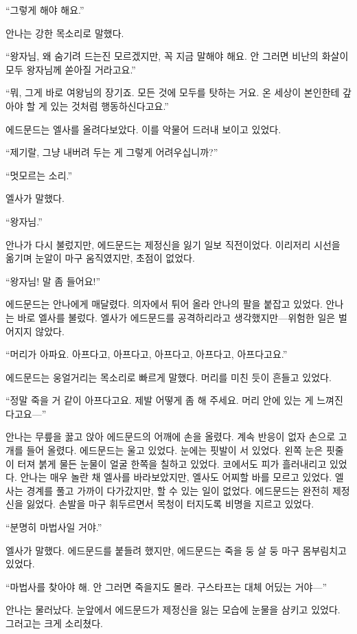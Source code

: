 ``그렇게 해야 해요.''

안나는 강한 목소리로 말했다.

``왕자님, 왜 숨기려 드는진 모르겠지만, 꼭 지금 말해야 해요. 안 그러면 비난의 화살이 모두 왕자님께 쏟아질 거라고요.''

``뭐, 그게 바로 여왕님의 장기죠. 모든 것에 모두를 탓하는 거요. 온 세상이 본인한테 갚아야 할 게 있는 것처럼 행동하신다고요.''

에드문드는 엘사를 올려다보았다. 이를 악물어 드러내 보이고 있었다.

``제기랄, 그냥 내버려 두는 게 그렇게 어려우십니까?''

``멋모르는 소리.''

엘사가 말했다.

``왕자님.''

안나가 다시 불렀지만, 에드문드는 제정신을 잃기 일보 직전이었다. 이리저리 시선을 옮기며 눈알이 마구 움직였지만, 초점이 없었다.

``왕자님! 말 좀 들어요!''

에드문드는 안나에게 매달렸다. 의자에서 튀어 올라 안나의 팔을 붙잡고 있었다. 안나는 바로 엘사를 불렀다. 엘사가 에드문드를 공격하리라고 생각했지만—위험한 일은 벌어지지 않았다.

``머리가 아파요. 아프다고, 아프다고, 아프다고, 아프다고, 아프다고요.''

에드문드는 웅얼거리는 목소리로 빠르게 말했다. 머리를 미친 듯이 흔들고 있었다.

``정말 죽을 거 같이 아프다고요. 제발 어떻게 좀 해 주세요. 머리 안에 있는 게 느껴진다고요—''

안나는 무릎을 꿇고 앉아 에드문드의 어깨에 손을 올렸다. 계속 반응이 없자 손으로 고개를 들어 올렸다. 에드문드는 울고 있었다. 눈에는 핏발이 서 있었다. 왼쪽 눈은 핏줄이 터져 붉게 물든 눈물이 얼굴 한쪽을 칠하고 있었다. 코에서도 피가 흘러내리고 있었다. 안나는 매우 놀란 채 엘사를 바라보았지만, 엘사도 어찌할 바를 모르고 있었다. 엘사는 경계를 풀고 가까이 다가갔지만, 할 수 있는 일이 없었다. 에드문드는 완전히 제정신을 잃었다. 손발을 마구 휘두르면서 목청이 터지도록 비명을 지르고 있었다.

``분명히 마법사일 거야.''

엘사가 말했다. 에드문드를 붙들려 했지만, 에드문드는 죽을 둥 살 둥 마구 몸부림치고 있었다.

``마법사를 찾아야 해. 안 그러면 죽을지도 몰라. 구스타프는 대체 어딨는 거야—''

안나는 물러났다. 눈앞에서 에드문드가 제정신을 잃는 모습에 눈물을 삼키고 있었다. 그러고는 크게 소리쳤다.

